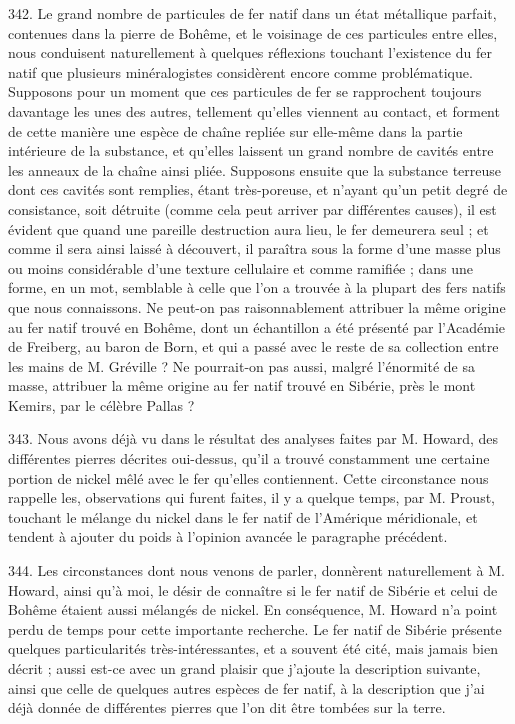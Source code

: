 \documentclass[a4paper, 11pt, oneside, polutonikogreek, french]{article}
\begin{document}
342. Le grand nombre de particules de fer natif dans un état métallique parfait, contenues dans la pierre de Bohême, et le voisinage de ces particules entre elles, nous conduisent naturellement à quelques réflexions touchant l'existence du fer natif que plusieurs minéralogistes considèrent encore comme problématique. Supposons pour un moment que ces particules de fer se rapprochent toujours davantage les unes des autres, tellement qu'elles viennent au contact, et forment de cette manière une espèce de chaîne repliée sur elle-même dans la partie intérieure de la substance, et qu'elles laissent un grand nombre de cavités entre les anneaux de la chaîne ainsi pliée. Supposons ensuite que la substance terreuse dont ces cavités sont remplies, étant très-poreuse, et n'ayant qu'un petit degré de consistance, soit détruite (comme cela peut arriver par différentes causes), il est évident que quand une pareille destruction aura lieu, le fer demeurera seul ; et comme il sera ainsi laissé à découvert, il paraîtra sous la forme d'une masse plus ou moins considérable d'une texture cellulaire et comme ramifiée ; dans une forme, en un mot, semblable à celle que l'on a trouvée à la plupart des fers natifs que nous connaissons. Ne peut-on pas raisonnablement attribuer la même origine au fer natif trouvé en Bohême, dont un échantillon a été présenté par l'Académie de Freiberg, au baron de Born, et qui a passé avec le reste de sa collection entre les mains de M. Gréville ? Ne pourrait-on pas aussi, malgré l'énormité de sa masse, attribuer la même origine au fer natif trouvé en Sibérie, près le mont Kemirs, par le célèbre Pallas ?

343. Nous avons déjà vu dans le résultat des analyses faites par M. Howard, des différentes pierres décrites oui-dessus, qu'il a trouvé constamment une certaine portion de nickel mêlé avec le fer qu'elles contiennent. Cette circonstance nous rappelle les, observations qui furent faites, il y a quelque temps, par M. Proust, touchant le mélange du nickel dans le fer natif de l'Amérique méridionale, et tendent à ajouter du poids à l'opinion avancée le paragraphe précédent.

344. Les circonstances dont nous venons de parler, donnèrent naturellement à M. Howard, ainsi qu'à moi, le désir de connaître si le fer natif de Sibérie et celui de Bohême étaient aussi mélangés de nickel. En conséquence, M. Howard n'a point perdu de temps pour cette importante recherche. Le fer natif de Sibérie présente quelques particularités très-intéressantes, et a souvent été cité, mais jamais bien décrit ; aussi est-ce avec un grand plaisir que j'ajoute la description suivante, ainsi que celle de quelques autres espèces de fer natif, à la description que j'ai déjà donnée de différentes pierres que l'on dit être tombées sur la terre.
\end{document}

